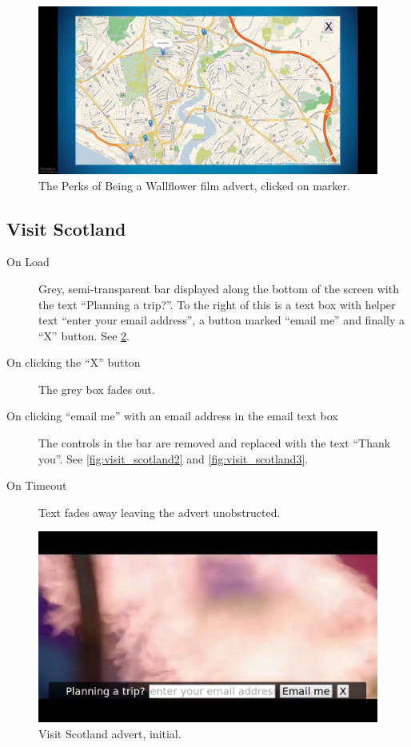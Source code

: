 	\begin{figure}[th]
		\centering
		\includegraphics[width=\textwidth,height=0.5\textheight,keepaspectratio]{images/adverts/wallflower-4.png}
		\caption{The Perks of Being a Wallflower film advert, clicked on marker.}
		\label{fig:wallflower4}
	\end{figure}

\clearpage
\subsection{Visit Scotland}
	\begin{description}
		\item[On Load]{Grey, semi-transparent bar displayed along the bottom of the screen with the text ``Planning a trip?''. To the right of this is a text box with helper text ``enter your email address'', a button marked ``email me'' and finally a ``X'' button. See \ref{fig:visit_scotland1}.}
		\item[On clicking the ``X'' button]{The grey box fades out.}
		\item[On clicking ``email me'' with an email address in the email text box]{The controls in the bar are removed and replaced with the text ``Thank you''. See \ref{fig:visit_scotland2} and \ref{fig:visit_scotland3}.}
		\item[On Timeout]{Text fades away leaving the advert unobstructed.}
	\end{description}

	\begin{figure}[th]
		\centering
		\includegraphics[width=\textwidth,height=0.5\textheight,keepaspectratio]{images/adverts/visit_scotland-1.png}
		\caption{Visit Scotland advert, initial.}
		\label{fig:visit_scotland1}
	\end{figure}

